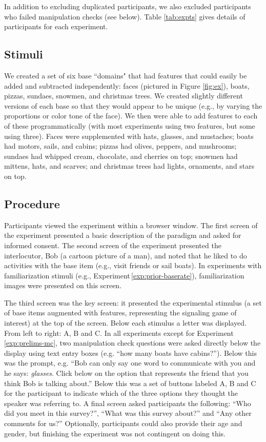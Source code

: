 \documentclass[man,noapacite]{apa2}
\newcounter{Experiment}
\newcommand{\exptref}[1]{Experiment\,\ref{#1}}
\begin{document}
In addition to excluding duplicated participants, we also excluded participants who failed manipulation checks (see below). Table \ref{tab:expts} gives details of participants for each experiment.

\subsection{Stimuli}

We created a set of six base ``domains" that had features that could easily be added and subtracted independently: faces (pictured in Figure \ref{fig:ex}), boats, pizzas, sundaes, snowmen, and christmas trees. We created slightly different versions of each base so that they would appear to be unique (e.g., by varying the proportions or color tone of the face). We then were able to add features to each of these programmatically (with most experiments using two features, but some using three). Faces were supplemented with hats, glasses, and mustaches; boats had motors, sails, and cabins; pizzas had olives, peppers, and mushrooms; sundaes had whipped cream, chocolate, and cherries on top; snowmen had mittens, hats, and scarves; and christmas trees had lights, ornaments, and stars on top.

\subsection{Procedure}

Participants viewed the experiment within a browser window. The first screen of the experiment presented a basic description of the paradigm and asked for informed consent. The second screen of the experiment presented the interlocutor, Bob (a cartoon picture of a man), and noted that he liked to do activities with the base item (e.g., visit friends or sail boats). In experiments with familiarization stimuli (e.g., \exptref{exp:prior-baserate}),  familiarization images were presented on this screen.

The third screen was the key screen: it presented the experimental stimulus (a set of base items augmented with features, representing the signaling game of interest) at the top of the screen. Below each stimulus a letter was displayed. From left to right: A, B and C. In all experiments except for \exptref{exp:prelims-mc}, two manipulation check questions were asked directly below the display using text entry boxes (e.g. ``how many boats have cabins?''). Below this was the prompt, e.g. ``Bob can only say one word to communicate with you and he says: {\it glasses}. Click below on the option that represents the friend that you think Bob is talking about.'' Below this was a set of buttons labeled A, B and C for the participant to indicate which of the three options they thought the speaker was referring to. A final screen asked participants the following: ``Who did you meet in this survey?'',  ``What was this survey about?'' and ``Any other comments for us?'' Optionally, participants could also provide their age and gender, but finishing the experiment was not contingent on doing this.
\end{document}
